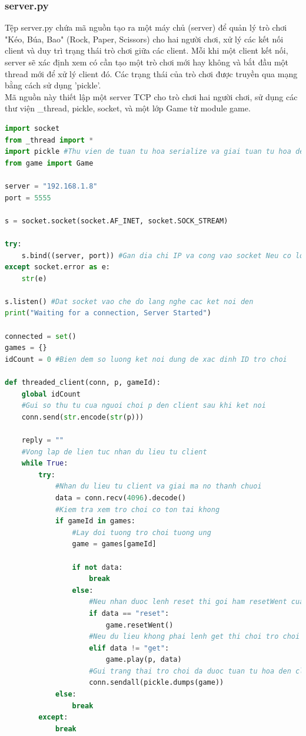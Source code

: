 \documentclass[a4paper]{article}
\begin{document}
\subsubsection{server.py}
Tệp server.py chứa mã nguồn tạo ra một máy chủ (server) để quản lý trò chơi "Kéo, Búa, Bao" (Rock, Paper, Scissors) cho hai người chơi, xử lý các kết nối client và duy trì trạng thái trò chơi giữa các client. Mỗi khi một client kết nối, server sẽ xác định xem có cần tạo một trò chơi mới hay không và bắt đầu một thread mới để xử lý client đó. Các trạng thái của trò chơi được truyền qua mạng bằng cách sử dụng 'pickle'.\\
Mã nguồn này thiết lập một server TCP cho trò chơi hai người chơi, sử dụng các thư viện \_thread, pickle, socket, và một lớp Game từ module game.
 \begin{mdframed}[hidealllines=true,backgroundcolor=magenta!10]
	\begin{lstlisting}[language=Python]
import socket
from _thread import *
import pickle #Thu vien de tuan tu hoa serialize va giai tuan tu hoa deserialize cac object Python giup chung co the truyen qua mang.
from game import Game

server = "192.168.1.8"
port = 5555

s = socket.socket(socket.AF_INET, socket.SOCK_STREAM)

try:
    s.bind((server, port)) #Gan dia chi IP va cong vao socket Neu co loi bat loi va luu tru thong bao loi
except socket.error as e:
    str(e)

s.listen() #Dat socket vao che do lang nghe cac ket noi den
print("Waiting for a connection, Server Started")

connected = set()
games = {}
idCount = 0 #Bien dem so luong ket noi dung de xac dinh ID tro choi

def threaded_client(conn, p, gameId):
    global idCount
    #Gui so thu tu cua nguoi choi p den client sau khi ket noi
    conn.send(str.encode(str(p))) 

    reply = ""
    #Vong lap de lien tuc nhan du lieu tu client
    while True:
        try:
            #Nhan du lieu tu client va giai ma no thanh chuoi
            data = conn.recv(4096).decode()
            #Kiem tra xem tro choi co ton tai khong
            if gameId in games:
                #Lay doi tuong tro choi tuong ung
                game = games[gameId]

                if not data:
                    break
                else:
                    #Neu nhan duoc lenh reset thi goi ham resetWent cua tro choi
                    if data == "reset":
                        game.resetWent()
                    #Neu du lieu khong phai lenh get thi choi tro choi voi du lieu nhan duoc
                    elif data != "get":
                        game.play(p, data)
                    #Gui trang thai tro choi da duoc tuan tu hoa den client
                    conn.sendall(pickle.dumps(game))
            else:
                break
        except:
            break


\end{lstlisting}
\end{mdframed}
\end{document}
